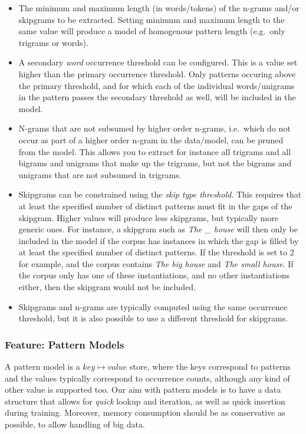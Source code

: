 \documentclass[a4paper,12pt]{article}
\begin{document}
\begin{itemize}
    \item The minimum and maximum length (in words/tokens) of the n-grams
        and/or skipgrams to be extracted. Setting minimum and maximum length to
        the same value will produce a model of homogenous pattern length
        (e.g.\ only trigrams or words).
    \item A secondary \emph{word} occurrence threshold can be configured. This is a value set higher than
        the primary occurrence threshold. Only patterns
        occuring above the primary threshold, and for which each of the
        individual words/unigrams in the pattern passes the secondary threshold as well, will
        be included in the model.
    \item N-grams that are not subsumed by higher order n-grams, i.e.\ which do
        not  occur as part of a higher order n-gram in the data/model, can be pruned
        from the model. This allows you to extract for instance all trigrams
        and all bigrams and unigrams that make up the trigrams, but not the
        bigrams and unigrams that are not subsumed in trigrams. 
    \item Skipgrams can be constrained using the \emph{skip type threshold}. This
        requires that at least the specified number of distinct patterns must fit in the
        gaps of the skipgram. Higher values will produce less skipgrams, but
        typically more generic ones. For instance, a skipgram such as \emph{The \_ house} will
        then only be included in the model if the corpus has instances in which the gap is
        filled by at least the specified number of distinct patterns. 
        If the threshold is set to 2 for example, and the corpus contains \emph{The
        big house} and \emph{The small house}. If the corpus only has
        one of these instantiations, and no other instantiations either, then the skipgram would not be included.
    \item Skipgrams and n-grams are typically computed using the same
        occurrence threshold, but it is also possible to use a different threshold
        for skipgrams.
\end{itemize}

\subsubsection{Feature: Pattern Models}
\label{sec:patternmodels}

A pattern model is a $key \mapsto value$ store, where the keys correspond to
patterns and the values typically correspond to occurrence counts, although any
kind of other value is supported too. Our aim with pattern models is to have a
data structure that allows for \emph{quick} lookup and iteration, as well as
quick insertion during training. Moreover, memory consumption should be as
conservative as possible, to allow handling of big data.
\end{document}
